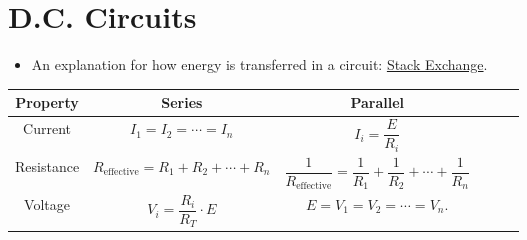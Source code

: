 \chapter{D.C. Circuits}
\begin{itemize}
    \item An explanation for how energy is transferred in a circuit: \href{https://physics.stackexchange.com/a/569312}{Stack Exchange}.
\end{itemize}
\begin{center}
    \begin{tabular}{|Sc|Sc|Sc|}
        \hline
        Property & Series & Parallel\\
        \hline
        Current & \(I_1=I_2=\cdots=I_n\) & \(I_i=\dfrac{E}{R_i}\)\\
        \hline
        Resistance & \(R_{\text{effective}}=R_1+R_2+\cdots+R_n\) & \(\dfrac{1}{R_{\text{effective}}}=\dfrac{1}{R_1}+\dfrac{1}{R_2}+\cdots+\dfrac{1}{R_n}\)\\
        \hline
        Voltage & \(V_i=\dfrac{R_i}{R_T}\cdot E\) & \(E=V_1=V_2=\cdots=V_n\).\\
        \hline
    \end{tabular}
\end{center}

